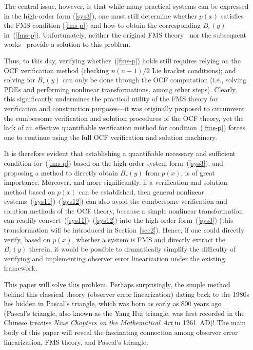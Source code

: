 \documentclass[11pt]{article}
\begin{document}
The central issue, however, is that while many practical systems can be expressed in the high-order form (\ref{sys3}), one must still determine whether $p(x)$ satisfies the FMS condition (\ref{fms-p}) and how to obtain the corresponding $B_r(y)$ in~(\ref{fms-p}). Unfortunately, neither the original FMS theory~\cite{Duan2020III} nor the subsequent works~\cite{Zhang2024Stabilization,Zhao2023Observer} provide a solution to this problem.

Thus, to this day, verifying whether~(\ref{fms-p}) holds still requires relying on the OCF verification method (checking $n(n-1)/2$ Lie bracket conditions); and solving for $B_r(y)$ can only be done through the OCF computation (i.e., solving PDEs and performing nonlinear transformations, among other steps). Clearly, this significantly undermines the practical utility of the FMS theory for verification and construction purposes---it was originally proposed to circumvent the cumbersome verification and solution procedures of the OCF theory, yet the lack of an effective quantifiable verification method for condition~(\ref{fms-p}) forces one to continue using the full OCF verification and solution machinery.

It is therefore evident that establishing a quantifiable necessary and sufficient condition for~(\ref{fms-p}) based on the high-order system form~(\ref{sys3}), and proposing a method to directly obtain $B_r(y)$ from $p(x)$, is of great importance. Moreover, and more significantly, if a verification and solution method based on $p(x)$ can be established, then general nonlinear systems~(\ref{sys11})--(\ref{sys12}) can also avoid the cumbersome verification and solution methods of the OCF theory, because a simple nonlinear transformation can readily convert~(\ref{sys11})--(\ref{sys12}) into the high-order form~(\ref{sys3}) (this transformation will be introduced in Section~\ref{sec2}). Hence, if one could directly verify, based on $p(x)$, whether a system is FMS and directly extract the $B_r(y)$ therein, it would be possible to dramatically simplify the difficulty of verifying and implementing observer error linearization under the existing framework.

This paper will solve this problem. Perhaps surprisingly, the simple method behind this classical theory (observer error linearization) dating back to the 1980s lies hidden in Pascal's triangle, which was born as early as 800 years ago (Pascal's triangle, also known as the Yang Hui triangle, was first recorded in the Chinese treatise \emph{Nine Chapters on the Mathematical Art} in 1261~AD)! The main body of this paper will reveal the fascinating connection among observer error linearization, FMS theory, and Pascal's triangle.
\end{document}
